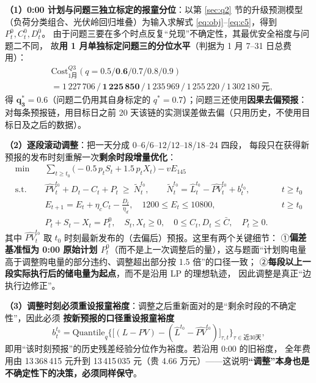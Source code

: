\documentclass[12pt,a4paper,fontset=fandol]{ctexart}
\begin{document}
\textbf{（1\nobreak）0:00 计划与问题三独立标定的报童分位}\nobreak：以第 \ref{sec:q2} 节的升级预测模型
（负荷分类组合\nobreak、光伏岭回归堆叠\nobreak）为输入求解式 \eqref{eq:obj}--\eqref{eq:c5}\nobreak，得到 $P^0_t,C^0_t,D^0_t$\nobreak。
由于问题三要在多个时点反复“兑现\nobreak”不确定性\nobreak，其最优安全裕度与问题二不同\nobreak，
故\textbf{用 1 月单独标定问题三的分位水平}（判据为 1 月 7--31 日总费用）\nobreak：
\begin{equation}
\begin{aligned}
&\mathrm{Cost}_{1\text{月}}^{Q3}(q=0.5/\textbf{0.6}/0.7/0.8/0.9)\\
&=1\,227\,706\,/\,\bm{1\,225\,850}\,/\,1\,235\,969\,/\,1\,255\,220\,/\,1\,302\,180\ \text{元},
\end{aligned}
\label{eq:qtune3}
\end{equation}
得 $\bm{q_3^*=0.6}$（问题二仍用其自身标定的 $q^*=0.7$\nobreak）；问题三还使用\textbf{因果去偏预报}\nobreak：
对每条预报链\nobreak，用目标日之前 20 天该链的实测误差做去偏（只用历史\nobreak，不使用目标日及之后的数据\nobreak）\nobreak。

\textbf{（2\nobreak）逐段滚动调整}\nobreak：把一天分成 $0$--$6$/$6$--$12$/$12$--$18$/$18$--$24$ 四段\nobreak，
每段只在获得新预报的发布时刻重解一次\textbf{剩余时段增量优化}\nobreak：
\begin{align}
\text{min}\quad & \sum_{t\ge t_0}\Big(-0.5\,p_tS_t+1.5\,p_tX_t\Big)-vE_{145}
\label{eq:adj_obj}\\
\text{s.t.}\quad & \widehat{PV}^{t_0}_t+D_t-C_t+P_t\ \ge\ \tilde N^{t_0}_t,\qquad
\tilde N^{t_0}_t=\hat L^{t_0}_t-\widehat{PV}^{t_0}_t+b^{t_0}_t, && t\ge t_0 \label{eq:adj_bal}\\
& E_{t+1}=E_t+\eta_cC_t-\frac{D_t}{\eta_d},\quad 1200\le E_t\le10800, && t\ge t_0 \label{eq:adj_soc}\\
& P_t+S_t-X_t=P^0_t,\quad S_t,X_t\ge0,\quad 0\le C_t,D_t\le\bar C,\quad P_t\ge0. && \label{eq:adj_link}
\end{align}
其中 $\widehat{PV}^{t_0}_t$ 取 $t_0$ 时刻最新发布的（去偏后\nobreak）预报\nobreak。这里有两个关键细节\nobreak：
①\textbf{偏差基准恒为 0:00 原始计划 $P^0_t$}（而不是上一次调整后的量\nobreak）\nobreak，这与题面“计划购电量高于调整购电量的部分违约、调整超出部分按 1.5 倍\nobreak”的口径一致\nobreak；
②\textbf{每段以上一段实际执行后的储电量为起点}\nobreak，而不是沿用 LP 的理想轨迹\nobreak，
因此调整是真正“边执行边修正\nobreak”\nobreak。

\textbf{（3\nobreak）调整时刻必须重设报童裕度}\nobreak：调整之后重新面对的是“剩余时段的不确定性\nobreak”\nobreak，因此必须
\textbf{按新预报的口径重设报童裕度}
\begin{equation}
b^{t_0}_t=\mathrm{Quantile}_{q}\Big\{\big[(L-PV)-( \hat L^{t_0}-\widehat{PV}^{t_0})\big]_{\tau,t}\Big\}_{\tau\in\text{近30天}},
\label{eq:adjbuffer}
\end{equation}
即用“该时刻预报\nobreak”的历史残差经验分位作为裕度\nobreak。若沿用 0:00 的旧裕度\nobreak，
全年费用由 13\,368\,415 元升到 13\,415\,035 元（贵 4.66 万元\nobreak）——这说明\textbf{“调整\nobreak”本身也是不确定性下的决策\nobreak，必须同样保守}\nobreak。
\end{document}
